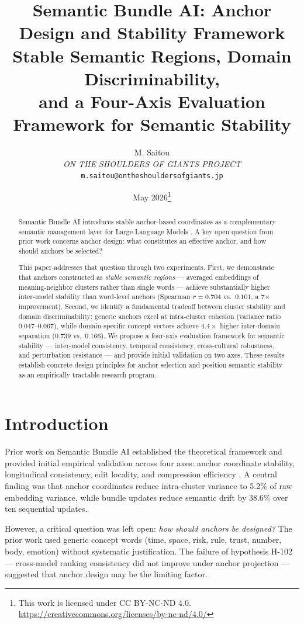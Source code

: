 \documentclass[11pt,a4paper]{article}
\title{
  \textbf{Semantic Bundle AI: Anchor Design and Stability Framework} \\[0.5em]
  \large Stable Semantic Regions, Domain Discriminability, \\
  and a Four-Axis Evaluation Framework for Semantic Stability
}
\author{
  M. Saitou \\
  \textit{ON THE SHOULDERS OF GIANTS PROJECT} \\
  \texttt{m.saitou@ontheshouldersofgiants.jp}
}
\date{May 2026\thanks{This work is licensed under CC BY-NC-ND 4.0.
\url{https://creativecommons.org/licenses/by-nc-nd/4.0/}}}
\begin{document}
\maketitle

\begin{abstract}
Semantic Bundle AI introduces stable anchor-based coordinates as a
complementary semantic management layer for Large Language Models
\cite{saitou2026semantic, saitou2026poc}. A key open question from
prior work concerns anchor design: what constitutes an effective anchor,
and how should anchors be selected?

This paper addresses that question through two experiments. First, we
demonstrate that anchors constructed as \textit{stable semantic regions}
--- averaged embeddings of meaning-neighbor clusters rather than single
words --- achieve substantially higher inter-model stability than
word-level anchors (Spearman $r = 0.704$ vs.\ $0.101$, a 7$\times$
improvement). Second, we identify a fundamental tradeoff between cluster
stability and domain discriminability: generic anchors excel at
intra-cluster cohesion (variance ratio $0.047$--$0.067$), while
domain-specific concept vectors achieve $4.4\times$ higher inter-domain
separation ($0.739$ vs.\ $0.166$). We propose a four-axis evaluation
framework for semantic stability --- inter-model consistency, temporal
consistency, cross-cultural robustness, and perturbation resistance ---
and provide initial validation on two axes. These results establish
concrete design principles for anchor selection and position semantic
stability as an empirically tractable research program.
\end{abstract}

\section{Introduction}
\label{sec:intro}

Prior work on Semantic Bundle AI established the theoretical framework
\cite{saitou2026semantic} and provided initial empirical validation across
four axes: anchor coordinate stability, longitudinal consistency, edit
locality, and compression efficiency \cite{saitou2026poc}. A central
finding was that anchor coordinates reduce intra-cluster variance to 5.2\%
of raw embedding variance, while bundle updates reduce semantic drift by
38.6\% over ten sequential updates.

However, a critical question was left open: \textit{how should anchors be
designed?} The prior work used generic concept words (time, space, risk,
rule, trust, number, body, emotion) without systematic justification. The
failure of hypothesis H-102 --- cross-model ranking consistency did not
improve under anchor projection --- suggested that anchor design may be
the limiting factor.
\end{document}
